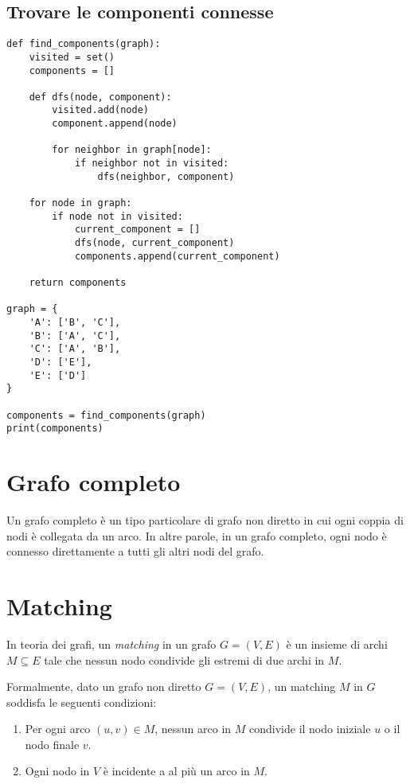 \subsection{Trovare le componenti connesse}
\begin{lstlisting}
def find_components(graph):
    visited = set()
    components = []

    def dfs(node, component):
        visited.add(node)
        component.append(node)

        for neighbor in graph[node]:
            if neighbor not in visited:
                dfs(neighbor, component)

    for node in graph:
        if node not in visited:
            current_component = []
            dfs(node, current_component)
            components.append(current_component)

    return components

graph = {
    'A': ['B', 'C'],
    'B': ['A', 'C'],
    'C': ['A', 'B'],
    'D': ['E'],
    'E': ['D']
}

components = find_components(graph)
print(components)
\end{lstlisting}


\section{Grafo completo}
Un grafo completo è un tipo particolare di grafo non diretto in cui ogni coppia di nodi è collegata da un arco. In altre parole, in un grafo completo, ogni nodo è connesso direttamente a tutti gli altri nodi del grafo.


\section{Matching}

In teoria dei grafi, un \textit{matching} in un grafo $G = (V, E)$ è un insieme di archi $M \subseteq E$ tale che nessun nodo condivide gli estremi di due archi in $M$.

Formalmente, dato un grafo non diretto $G = (V, E)$, un matching $M$ in $G$ soddisfa le seguenti condizioni:
\begin{enumerate}
    \item Per ogni arco $(u, v) \in M$, nessun arco in $M$ condivide il nodo iniziale $u$ o il nodo finale $v$.
    \item Ogni nodo in $V$ è incidente a al più un arco in $M$.
\end{enumerate}

